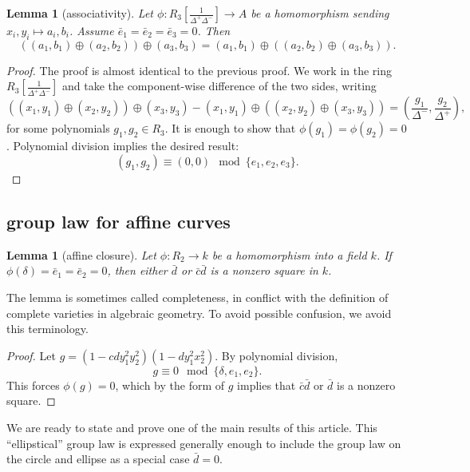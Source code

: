 \documentclass[18pt]{article}
\newtheorem{lemma}[theorem]{Lemma}
\newcommand{\f}[1]{\frac{1}{#1}}
\def\cong{\equiv}
\begin{document}
\begin{lemma}[associativity] \label{lemma:assoc} Let
  $\phi:R_3[\f{\Delta^+\Delta^-}]\to A$ be a homomorphism sending
  $x_i,y_i\mapsto a_i,b_i$.  Assume $\bar e_1 = \bar e_ 2= \bar e_3 =
  0$. Then
\[
((a_1,b_1)\oplus (a_2,b_2)) \oplus (a_3,b_3)=
(a_1,b_1)\oplus ((a_2,b_2) \oplus (a_3,b_3)).
\]
\end{lemma}

\begin{proof} The proof is almost identical to the previous proof.  We
  work in the ring $R_3[\f{\Delta^+\Delta^-}]$ and take the
  component-wise difference of the two sides, writing
\[
((x_1,y_1)\oplus (x_2,y_2)) \oplus (x_3,y_3)-
(x_1,y_1)\oplus ((x_2,y_2) \oplus (x_3,y_3)) 
= (\frac{g_1}{\Delta^-},\frac{g_2}{\Delta^+}),
\]
for some polynomials $g_1,g_2 \in R_3$.  
It is enough to show that $\phi(g_1)=\phi(g_2)=0$. 
Polynomial division implies the desired result:
\[
(g_1,g_2)\cong (0,0) \mod \{e_1,e_2,e_3\}.
\]
\end{proof}

\subsection{group law for affine curves}

\begin{lemma}[affine closure] \label{lemma:affine} Let $\phi:R_2\to k$
  be a homomorphism into a field $k$.  If $\phi(\delta)=\bar e_1=\bar
  e_2=0$, then either $\bar d$ or $\bar c \bar d$ is a nonzero square
  in $k$.
\end{lemma}

The lemma is sometimes called completeness, in conflict with the
definition of complete varieties in algebraic geometry.  To avoid
possible confusion, we avoid this terminology.

\begin{proof} 
  Let $g = (1 - c d y_1^2 y_2 ^2) (1 - d y_1^2 x_2^2)$.  By polynomial
  division,
\begin{equation}\label{eqn:squares}
  g \cong 0 \mod \{\delta,e_1,e_2\}.
\end{equation}
This forces $\phi(g)=0$, which by the form of $g$ implies that $\bar
c\bar d$ or $\bar d$ is a nonzero square.
\end{proof}

We are ready to state and prove one of the main results of this
article.  This ``ellipstical'' group law is expressed generally enough
to include the group law on the circle and ellipse as a special case 
$\bar d = 0$.
\end{document}
